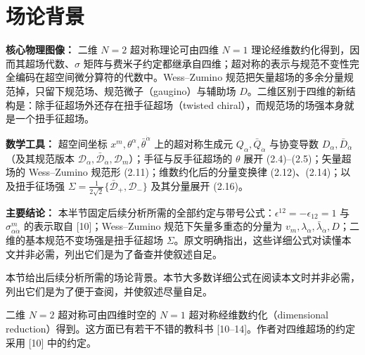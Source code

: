 

\section{场论背景}

\begin{keytakeaway}
\textbf{核心物理图像：} 二维 $N=2$ 超对称理论可由四维 $N=1$ 理论经维数约化得到，因而其超场代数、$\sigma$ 矩阵与费米子约定都继承自四维；超对称的表示与规范不变性完全编码在超空间微分算符的代数中。Wess--Zumino 规范把矢量超场的多余分量规范掉，只留下规范场、规范微子（gaugino）与辅助场 $D$。二维区别于四维的新结构是：除手征超场外还存在扭手征超场（twisted chiral），而规范场的场强本身就是一个扭手征超场。
\par\textbf{数学工具：} 超空间坐标 $x^m,\theta^\alpha,\bar\theta^{\dot\alpha}$ 上的超对称生成元 $Q_\alpha,\bar Q_{\dot\alpha}$ 与协变导数 $D_\alpha,\bar D_{\dot\alpha}$（及其规范版本 $\mathcal D_\alpha,\bar{\mathcal D}_{\dot\alpha},\mathcal D_m$）；手征与反手征超场的 $\theta$ 展开 (2.4)--(2.5)；矢量超场的 Wess--Zumino 规范形 (2.11)；维数约化后的分量变换律 (2.12)、(2.14)；以及扭手征场强 $\Sigma=\frac{1}{2\sqrt2}\{\bar{\mathcal D}_+,\mathcal D_-\}$ 及其分量展开 (2.16)。
\par\textbf{主要结论：} 本半节固定后续分析所需的全部约定与带号公式：$\epsilon^{12}=-\epsilon_{12}=1$ 与 $\sigma^m_{\alpha\dot\alpha}$ 的表示取自 [10]；Wess--Zumino 规范下矢量多重态的分量为 $v_m,\lambda_\alpha,\bar\lambda_{\dot\alpha},D$；二维的基本规范不变场强是扭手征超场 $\Sigma$。原文明确指出，这些详细公式对读懂本文并非必需，列出它们是为了备查并使叙述自足。
\end{keytakeaway}

本节给出后续分析所需的场论背景。本节大多数详细公式在阅读本文时并非必需，列出它们是为了便于查阅，并使叙述尽量自足。

二维 $N=2$ 超对称可由四维时空的 $N=1$ 超对称经维数约化（dimensional reduction）得到。这方面已有若干不错的教科书 [10--14]。作者对四维超场的约定采用 [10] 中的约定。

